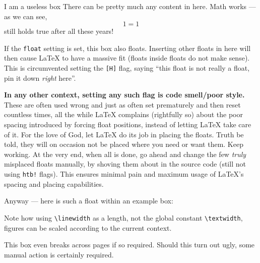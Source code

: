 \begin{example}[%
    label={ex:example},%
]{%
    I am a useless box%
}
    There can be pretty much any content in here.
    Math works --- as we can see,
    \begin{equation}
        1 = 1
    \end{equation}
    still holds true after all these years!

    If the \verb|float| setting is set, this box also floats.
    Inserting other floats in here will then cause \LaTeX{} to have a massive fit
    (floats inside floats do not make sense).
    This is circumvented setting the \verb|[H]| flag,
    saying \enquote{this float is not really a float, pin it down \emph{right} here}.

    \textbf{In any other context, setting any such flag is code smell/poor style.}
    These are often used wrong and just as often set prematurely and then reset
    countless times, all the while \LaTeX{} complains (rightfully so) about the poor
    spacing introduced by forcing float positions, instead of letting \LaTeX{} take
    care of it.
    For the love of God, let \LaTeX{} do its job in placing the floats.
    Truth be told, they will on occasion not be placed where you need or want them.
    Keep working.
    At the very end, when all is done, go ahead and change the few \emph{truly}
    misplaced floats manually, by shoving them about in the source code
    (still not using \verb|htb!| flags).
    This ensures minimal pain and maximum usage of \LaTeX{}'s spacing and placing
    capabilities.

    Anyway --- here is such a float within an example box:
    \begin{figure}[H]
    \end{figure}
    Note how using \verb|\linewidth| as a length, not the global constant
    \verb|\textwidth|, figures can be scaled according to the current context.

    This box even breaks across pages if so required.
    Should this turn out ugly, some manual action is certainly required.
\end{example}
